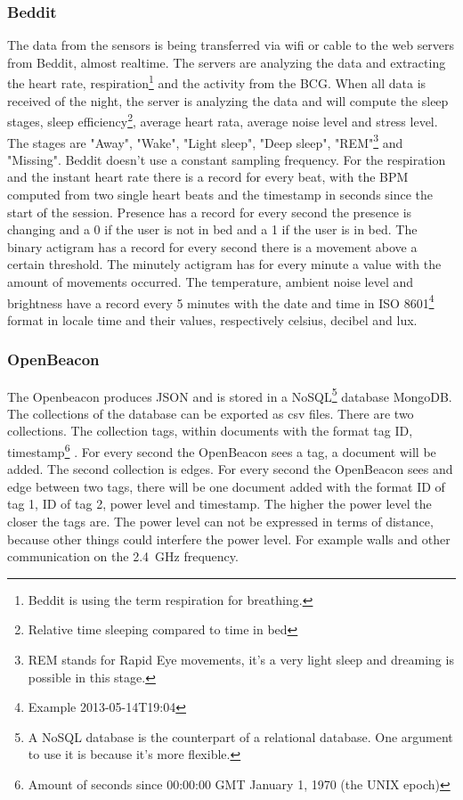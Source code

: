 		\subsubsection{Beddit}
		\label{sec:datadescriptionbeddit}
		The data from the sensors is being transferred via wifi or cable to the web servers from Beddit, almost realtime. The servers are analyzing the data and extracting the heart rate, respiration\footnote{Beddit is using the term respiration for breathing.} and the activity from the BCG. When all data is received of the night, the server is analyzing the data and will compute the sleep stages, sleep efficiency\footnote{Relative time sleeping compared to time in bed}, average heart rata, average noise level and stress level. The stages are "Away", "Wake", "Light sleep", "Deep sleep", "REM"\footnote{REM stands for Rapid Eye movements, it's a very light sleep and dreaming is possible in this stage.} and "Missing". Beddit doesn't use a constant sampling frequency. For the respiration and the instant heart rate there is a record for every beat, with the BPM computed from two single heart beats and the timestamp in seconds since the start of the session. Presence has a record for every second the presence is changing and a 0 if the user is not in bed and a 1 if the user is in bed. The binary actigram has a record for every second there is a movement above a certain threshold. The minutely actigram has for every minute a value with the amount of movements occurred. The temperature, ambient noise level and brightness have a record every 5 minutes with the date and time in ISO 8601\footnote{Example 2013-05-14T19:04\cite{iso8601}} format in locale time and their values, respectively celsius, decibel and lux.

		\subsubsection{OpenBeacon}
			The Openbeacon produces JSON and is stored in a NoSQL\footnote{A NoSQL database is the counterpart of a relational database. One argument to use it is because it's more flexible.} database MongoDB. The collections of the database can be exported as csv files.
			There are two collections. The collection tags, within documents with the format tag ID, timestamp\footnote{Amount of seconds since 00:00:00 GMT January 1, 1970 (the UNIX epoch)} . For every second the OpenBeacon sees a tag, a document will be added.
			The second collection is edges. For every second the OpenBeacon sees and edge between two tags, there will be one document added with the format ID of tag 1, ID of tag 2, power level and timestamp.
			The higher the power level the closer the tags are. The power level can not be expressed in terms of distance, because other things could interfere the power level. For example walls and other communication on the \SI{2.4}{\giga\hertz} frequency.
